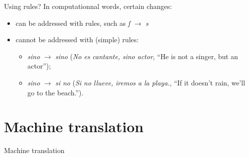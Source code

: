 \documentclass[aspectratio=169]{beamer}
\begin{document}
    \begin{frame}{Using rules?}
        In computationnal words, certain changes:
        \begin{itemize}
            \item can be addressed with rules, such as \textit{ſ} $\to$ \textit{s}
            \item cannot be addressed with (simple) rules:
            \begin{itemize}
                \item \textit{sino} $\to$ \textit{sino} (\textit{No es cantante, sino actor}, ``He is not a singer, but an actor'');
                \item \textit{sino} $\to$ \textit{si no} (\textit{Si no llueve, iremos a la playa.}, ``If it doesn’t rain, we’ll go to the beach.'').
            \end{itemize}
        \end{itemize}
    \end{frame}




    \section{Machine translation}

    \begin{frame}
	\begin{center}
	    Machine translation
	\end{center}
    \end{frame}

\end{document}

